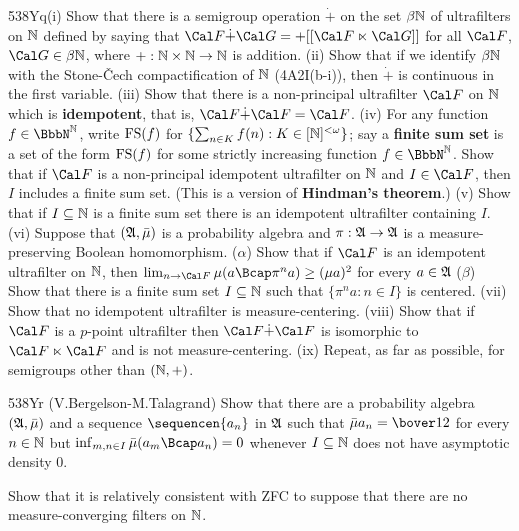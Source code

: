 {\spheader 538Yq(i) Show that there is a semigroup operation $\dot+$ on
the set $\beta\Bbb N$ of ultrafilters on $\Bbb N$ defined by saying that
$\Cal F\dot+\Cal G=+[[\Cal F\ltimes\Cal G]]$ for all $\Cal F$,
$\Cal G\in\beta\Bbb N$, where $+:\Bbb N\times\Bbb N\to\Bbb N$ is addition.
(ii) Show that if we identify $\beta\Bbb N$ with the Stone-\v{C}ech
compactification of $\Bbb N$ (4A2I(b-i)), then $\dot+$ is
continuous in the first variable.   (iii) Show that there is a
non-principal ultrafilter $\Cal F$ on $\Bbb N$ which is {\bf idempotent},
that is, $\Cal F\dot+\Cal F=\Cal F$.
(iv) For any function $f\in\NN$, write $\mathop{\text{FS}}\nolimits(f)$ for
$\{\sum_{n\in K}f(n):K\in[\Bbb N]^{<\omega}\}$;  say a {\bf finite sum set}
is a set of the form $\mathop{\text{FS}}\nolimits(f)$ for some strictly increasing function
$f\in\NN$.   Show that if $\Cal F$ is a non-principal idempotent
ultrafilter on $\Bbb N$ and $I\in\Cal F$, then $I$ includes a finite sum
set.   (This is a version of {\bf Hindman's theorem}.)
(v) Show that if $I\subseteq\Bbb N$ is a finite sum set
there is an idempotent ultrafilter containing $I$.
(vi) Suppose that $(\frak A,\bar\mu)$ is a probability algebra and
$\pi:\frak A\to\frak A$ is a measure-preserving Boolean homomorphism.
($\alpha$) Show that if $\Cal F$ is an idempotent ultrafilter on $\Bbb N$,
then
$\lim_{n\to\Cal F}\mu(a\Bcap\pi^na)\ge(\mu a)^2$ for every $a\in\frak A$
($\beta$) Show that there is a finite sum set $I\subseteq\Bbb N$ such that
$\{\pi^na:n\in I\}$ is centered.
(vii) Show that no idempotent ultrafilter is measure-centering.
(viii) Show that if $\Cal F$ is a $p$-point ultrafilter then
$\Cal F\dot+\Cal F$ is isomorphic to $\Cal F\ltimes\Cal F$ and is
not measure-centering.
(ix) Repeat, as far as possible, for semigroups other than $(\Bbb N,+)$.

\spheader 538Yr (V.Bergelson-M.Talagrand) Show that there are a probability
algebra $(\frak A,\bar\mu)$ and a sequence $\sequencen{a_n}$ in $\frak A$
such that $\bar\mu a_n=\bover12$ for every $n\in\Bbb N$ but
$\inf_{m,n\in I}\bar\mu(a_m\Bcap a_n)=0$ whenever
$I\subseteq\Bbb N$ does not have asymptotic density $0$.
}%

Show that it is relatively consistent with ZFC to suppose that there are
no measure-converging filters on $\Bbb N$.



